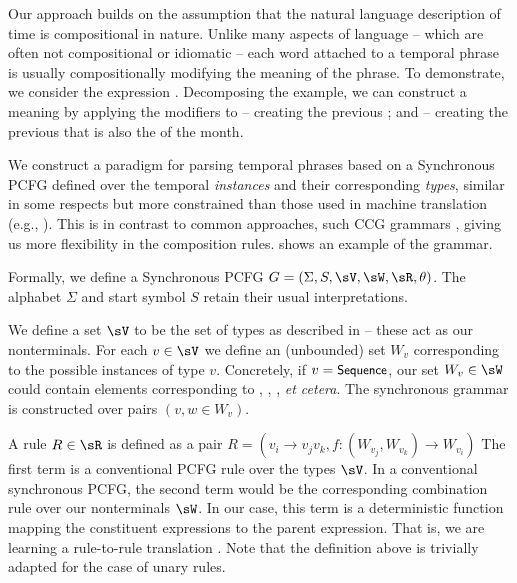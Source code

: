 Our approach builds on the assumption that the natural language description
	of time is compositional in nature.
Unlike many aspects of language  -- which are often not compositional or
	idiomatic -- each word attached to a temporal phrase is 
	usually compositionally modifying the meaning of the phrase.
To demonstrate, we consider the expression .
Decomposing the example, we can construct a meaning by 
	applying the modifiers  to  -- 
	creating the previous ;
	and  -- creating the previous  that is
	also the  of the month.

We construct a paradigm for parsing temporal phrases based on a Synchronous
	PCFG defined over the temporal \textit{instances} and their
	corresponding \textit{types}, similar in some respects but more
	constrained than those used in machine translation 
	(e.g., ).
This is in contrast to common approaches, such CCG 
	grammars 
	\cite{key:2000steedman-ccg,key:2004bos-ccg,2011kwiatkowski-semantics},
	giving us more flexibility in the composition rules.
 shows an example of the grammar.

Formally, we define a Synchronous PCFG 
	$G = \left(\Sigma,S,\sV,\sW,\sR,\theta\right)$.
The alphabet $\Sigma$ and start symbol $S$ retain their usual interpretations.

We define a set $\sV$ to be the set of types as described in
	 -- these act as our nonterminals.
For each $v \in \sV$ we define an (unbounded) set $W_v$ corresponding to the 
	possible instances of type $v$.
Concretely, if $v=\textsf{\small{Sequence}}$, our set $W_v \in \sW$ could contain elements
	corresponding to , , ,
	\textit{et cetera}.
The synchronous grammar is constructed over pairs $(v,w \in W_v)$.

A rule $R \in \sR$ is defined as a pair 
	$R = \left(v_i \rightarrow v_jv_k, 
		f : (W_{v_j},W_{v_k}) \rightarrow W_{v_i}\right)$
The first term is a conventional PCFG rule over the types
	$\sV$.
In a conventional synchronous PCFG, the second term would be the corresponding
	combination rule over our nonterminals $\sW$.
In our case, this term is a deterministic function mapping the
	constituent expressions to the parent expression.
That is, we are learning a rule-to-rule translation 
	\cite{key:1976bach-semantics}.
Note that the definition above is trivially adapted for the case of unary
	rules.


